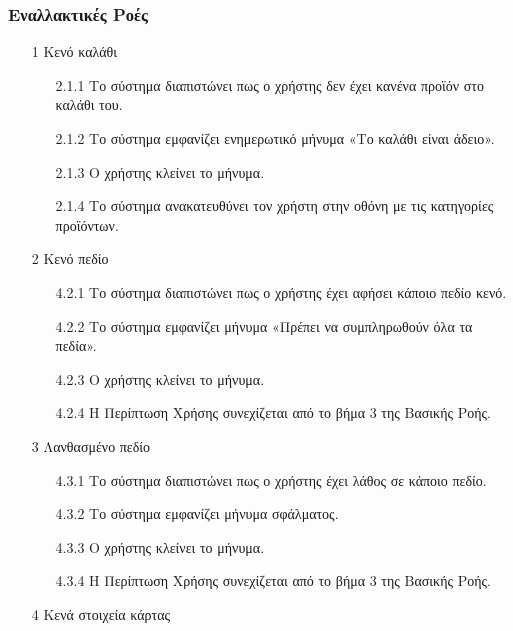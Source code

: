 \documentclass[12pt,a4paper,twoside]{book}
\begin{document}
\subsubsection{Εναλλακτικές Ροές}
\begin{enumerate}
  \item[1 ] Κενό καλάθι  %
        \begin{enumerate}
          \item[2.1.1 ] Το σύστημα διαπιστώνει πως ο χρήστης δεν έχει κανένα προϊόν στο καλάθι του. %
          \item[2.1.2 ] Το σύστημα εμφανίζει ενημερωτικό μήνυμα «Το καλάθι είναι άδειο». %
          \item[2.1.3 ] Ο χρήστης κλείνει το μήνυμα. %
          \item[2.1.4 ] Το σύστημα ανακατευθύνει τον χρήστη στην οθόνη με τις κατηγορίες προϊόντων.  %
        \end{enumerate}
  \item[2 ] Κενό πεδίο %
        \begin{enumerate}
          \item[4.2.1 ] Το σύστημα διαπιστώνει πως ο χρήστης έχει αφήσει κάποιο πεδίο κενό. %
          \item[4.2.2 ] Το σύστημα εμφανίζει μήνυμα «Πρέπει να συμπληρωθούν όλα τα πεδία». %
          \item[4.2.3 ] Ο χρήστης κλείνει το μήνυμα. %
          \item[4.2.4 ] Η Περίπτωση Χρήσης συνεχίζεται από το βήμα 3 της Βασικής Ροής. %
        \end{enumerate}
  \item[3 ] Λανθασμένο πεδίο %
        \begin{enumerate}
          \item[4.3.1 ] Το σύστημα διαπιστώνει πως ο χρήστης έχει λάθος σε κάποιο πεδίο. %
          \item[4.3.2 ] Το σύστημα εμφανίζει μήνυμα σφάλματος. %
          \item[4.3.3 ] Ο χρήστης κλείνει το μήνυμα. %
          \item[4.3.4 ] Η Περίπτωση Χρήσης συνεχίζεται από το βήμα 3 της Βασικής Ροής. %
        \end{enumerate}
  \item[4 ] Κενά στοιχεία κάρτας %
        \begin{enumerate}

\end{enumerate}
\end{enumerate}
\end{document}
